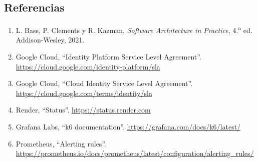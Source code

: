 \documentclass[11pt,a4paper]{article}
\begin{document}
\subsection*{Referencias}
\begin{enumerate}
  \item L. Bass, P. Clements y R. Kazman, \emph{Software Architecture in Practice}, 4.\textsuperscript{a} ed. Addison-Wesley, 2021.
  \item Google Cloud, ``Identity Platform Service Level Agreement''. \url{https://cloud.google.com/identity-platform/sla}
  \item Google Cloud, ``Cloud Identity Service Level Agreement''. \url{https://cloud.google.com/terms/identity/sla}
  \item Render, ``Status''. \url{https://status.render.com}
  \item Grafana Labs, ``k6 documentation''. \url{https://grafana.com/docs/k6/latest/}
  \item Prometheus, ``Alerting rules''. \url{https://prometheus.io/docs/prometheus/latest/configuration/alerting_rules/}
\end{enumerate}
\end{document}
